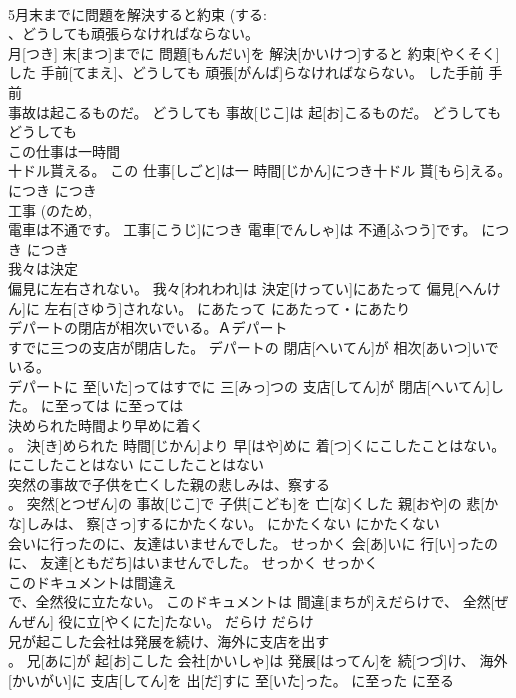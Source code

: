 \documentclass[8pt]{extreport}
\begin{document}
\begin{CJK}{UTF8}{min}
\\	5月末までに問題を解決すると約束 (する: 
\\	、どうしても頑張らなければならない。	
\\	月[つき] 末[まつ]までに 問題[もんだい]を 解決[かいけつ]すると 約束[やくそく]した 手前[てまえ]、どうしても 頑張[がんば]らなければならない。	した手前	手前	
\\	事故は起こるものだ。	どうしても 事故[じこ]は 起[お]こるものだ。	どうしても	どうしても~	
\\	この仕事は一時間 
\\	十ドル貰える。	この 仕事[しごと]は一 時間[じかん]につき十ドル 貰[もら]える。	につき	につき	
\\	工事 (のため, 
\\	電車は不通です。	工事[こうじ]につき 電車[でんしゃ]は 不通[ふつう]です。	につき	につき	
\\	我々は決定 
\\	偏見に左右されない。	我々[われわれ]は 決定[けってい]にあたって 偏見[へんけん]に 左右[さゆう]されない。	にあたって	にあたって・にあたり	
\\	デパートの閉店が相次いでいる。Ａデパート 
\\	すでに三つの支店が閉店した。	デパートの 閉店[へいてん]が 相次[あいつ]いでいる。 
\\	[えい]デパートに 至[いた]ってはすでに 三[みっ]つの 支店[してん]が 閉店[へいてん]した。	に至っては	に至っては	
\\	決められた時間より早めに着く 
\\	。	決[き]められた 時間[じかん]より 早[はや]めに 着[つ]くにこしたことはない。	にこしたことはない	にこしたことはない	
\\	突然の事故で子供を亡くした親の悲しみは、察する 
\\	。	突然[とつぜん]の 事故[じこ]で 子供[こども]を 亡[な]くした 親[おや]の 悲[かな]しみは、 察[さっ]するにかたくない。	にかたくない	にかたくない	
\\	会いに行ったのに、友達はいませんでした。	せっかく 会[あ]いに 行[い]ったのに、 友達[ともだち]はいませんでした。	せっかく	せっかく~	
\\	このドキュメントは間違え 
\\	で、全然役に立たない。	このドキュメントは 間違[まちが]えだらけで、 全然[ぜんぜん] 役に立[やくにた]たない。	だらけ	だらけ	
\\	兄が起こした会社は発展を続け、海外に支店を出す 
\\	。	兄[あに]が 起[お]こした 会社[かいしゃ]は 発展[はってん]を 続[つづ]け、 海外[かいがい]に 支店[してん]を 出[だ]すに 至[いた]った。	に至った	に至る	

\end{CJK}
\end{document}
